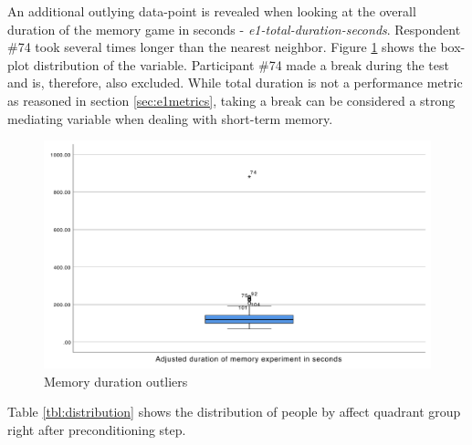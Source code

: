 		An additional outlying data-point is revealed when looking at the overall duration of the memory game in seconds - \textit{e1-total-duration-seconds}. Respondent \#74 took several times longer than the nearest neighbor. Figure \ref{fig:memoryoutlier2} shows the box-plot distribution of the variable. Participant \#74 made a break during the test and is, therefore, also excluded. While total duration is not a performance metric as reasoned in section \ref{sec:e1metrics}, taking a break can be considered a strong mediating variable when dealing with short-term memory.
		
		
		\begin{figure}
			\centering
			\includegraphics[width=0.7\linewidth]{graphics/memoryOutlier2}
			\caption{Memory duration outliers }
			\label{fig:memoryoutlier2}
		\end{figure}
	
		Table \ref{tbl:distribution} shows the distribution of people by affect quadrant group right after preconditioning step. 

